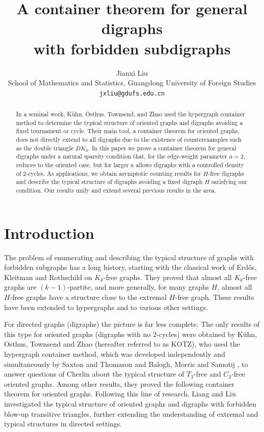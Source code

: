 \documentclass[11pt,a4paper]{article}
\title{A container theorem for general digraphs \\
with forbidden subdigraphs}
\author{Jianxi Liu \\ School of Mathematics and Statistics, Guangdong University of Foreign Studies \\ \texttt{jxliu@gdufs.edu.cn}}
\date{}
\begin{document}
\maketitle

\begin{abstract}
In a seminal work, K\"uhn, Osthus, Townsend, and Zhao used the hypergraph container method to determine the typical structure of oriented graphs and digraphs avoiding a fixed tournament or cycle. Their main tool, a container theorem for oriented graphs, does not directly extend to all digraphs due to the existence of counterexamples such as the double triangle $DK_3$. In this paper we prove a container theorem for general digraphs under a natural sparsity condition that, for the edge-weight parameter $a=2$, reduces to the oriented case, but for larger $a$ allows digraphs with a controlled density of 2-cycles. As applications, we obtain asymptotic counting results for $H$-free digraphs and describe the typical structure of digraphs avoiding a fixed digraph $H$ satisfying our condition. Our results unify and extend several previous results in the area.
\end{abstract}

\section{Introduction}

The problem of enumerating and describing the typical structure of graphs with forbidden subgraphs has a long history, starting with the classical work of Erd\H{o}s, Kleitman and Rothschild \cite{ERD1976} on $K_k$-free graphs. They proved that almost all $K_k$-free graphs are $(k-1)$-partite, and more generally, for many graphs $H$, almost all $H$-free graphs have a structure close to the extremal $H$-free graph. These results have been extended to hypergraphs and to various other settings.

For directed graphs (digraphs) the picture is far less complete. The only results of this type for oriented graphs (digraphs with no 2-cycles) were obtained by K\"uhn, Osthus, Townsend and Zhao \cite{KUH2017} (hereafter referred to as KOTZ), who used the hypergraph container method, which was developed independently and simultaneously by Saxton and Thomason \cite{SAX2015} and Balogh, Morris and Samotij \cite{BAL2015}, to answer questions of Cherlin \cite{CHE1998} about the typical structure of $T_3$-free and $C_3$-free oriented graphs. Among other results, they proved the following container theorem for oriented graphs. Following this line of research, Liang and Liu \cite{LIANG2022} investigated the typical structure of oriented graphs and digraphs with forbidden blow-up transitive triangles, further extending the understanding of extremal and typical structures in directed settings.
\end{document}
